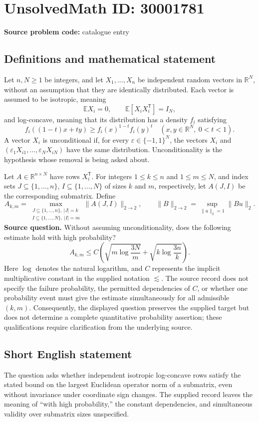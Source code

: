 \documentclass[11pt]{article}
\newcommand{\R}{\mathbb{R}}
\newcommand{\E}{\mathbb{E}}
\begin{document}
\section*{UnsolvedMath ID: 30001781}
\textbf{Source problem code:} catalogue entry
\subsection{Definitions and mathematical statement}
Let \(n,N\geq 1\) be integers, and let \(X_1,\ldots,X_n\) be independent random vectors in \(\R^N\), without an assumption that they are identically distributed. Each vector is assumed to be isotropic, meaning
\[
\E X_i=0,\qquad \E[X_iX_i^{\mathsf T}]=I_N,
\]
and log-concave, meaning that its distribution has a density \(f_i\) satisfying
\[
f_i((1-t)x+ty)\geq f_i(x)^{1-t}f_i(y)^t
\quad(x,y\in\R^N,\ 0<t<1).
\]
A vector \(X_i\) is unconditional if, for every \(\varepsilon\in\{-1,1\}^N\), the vectors \(X_i\) and \((\varepsilon_1X_{i1},\ldots,\varepsilon_NX_{iN})\) have the same distribution. Unconditionality is the hypothesis whose removal is being asked about.

Let \(A\in\R^{n\times N}\) have rows \(X_i^{\mathsf T}\). For integers \(1\leq k\leq n\) and \(1\leq m\leq N\), and index sets \(J\subseteq\{1,\ldots,n\}\), \(I\subseteq\{1,\ldots,N\}\) of sizes \(k\) and \(m\), respectively, let \(A(J,I)\) be the corresponding submatrix. Define
\[
A_{k,m}=\max_{\substack{J\subseteq\{1,\ldots,n\},\ |J|=k\\ I\subseteq\{1,\ldots,N\},\ |I|=m}}
\|A(J,I)\|_{2\to2},
\qquad
\|B\|_{2\to2}=\sup_{\|u\|_2=1}\|Bu\|_2.
\]
\textbf{Source question.} Without assuming unconditionality, does the following estimate hold with high probability?
\[
A_{k,m}\leq C\left(\sqrt{m\log\frac{3N}{m}}+\sqrt{k\log\frac{3n}{k}}\right).
\]
Here \(\log\) denotes the natural logarithm, and \(C\) represents the implicit multiplicative constant in the supplied notation \(\lesssim\). The source record does not specify the failure probability, the permitted dependencies of \(C\), or whether one probability event must give the estimate simultaneously for all admissible \((k,m)\). Consequently, the displayed question preserves the supplied target but does not determine a complete quantitative probability assertion; these qualifications require clarification from the underlying source.
\subsection{Short English statement}
The question asks whether independent isotropic log-concave rows satisfy the stated bound on the largest Euclidean operator norm of a submatrix, even without invariance under coordinate sign changes. The supplied record leaves the meaning of ``with high probability,'' the constant dependencies, and simultaneous validity over submatrix sizes unspecified.
\end{document}
